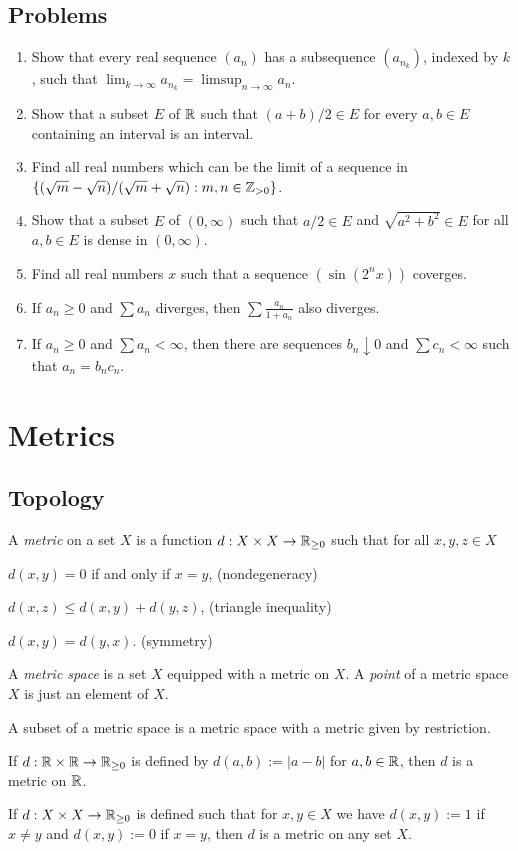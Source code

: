 \documentclass{../../large}
\begin{document}
\section*{Problems}
\begin{enumerate}
\item Show that every real sequence $(a_n)$ has a subsequence $(a_{n_k})$, indexed by $k$, such that $\lim_{k\to\infty}a_{n_k}=\limsup_{n\to\infty}a_n$.
\item Show that a subset $E$ of $\mathbb{R}$ such that $(a+b)/2\in E$ for every $a,b\in E$ containing an interval is an interval.
\item Find all real numbers which can be the limit of a sequence in $\{(\sqrt m-\sqrt n)/(\sqrt m+\sqrt n):m,n\in\mathbb{Z}_{>0}\}$.
\item Show that a subset $E$ of $(0,\infty)$ such that $a/2\in E$ and $\sqrt{a^2+b^2}\in E$ for all $a,b\in E$ is dense in $(0,\infty)$.
\item Find all real numbers $x$ such that a sequence $(\sin(2^nx))$ coverges.
\item If $a_n\ge0$ and $\sum a_n$ diverges, then $\sum\frac{a_n}{1+a_n}$ also diverges.
\item If $a_n\ge0$ and $\sum a_n<\infty$, then there are sequences $b_n\downarrow0$ and $\sum c_n<\infty$ such that $a_n=b_nc_n$.
\end{enumerate}






\chapter{Metrics}
\section{Topology}
\begin{prb}
A \emph{metric} on a set $X$ is a function $d:X\times X\to\mathbb{R}_{\ge0}$ such that for all $x,y,z\in X$
\begin{parts}[(i)]
\item $d(x,y)=0$ if and only if $x=y$, \hfill(nondegeneracy)
\item $d(x,z)\le d(x,y)+d(y,z)$, \hfill(triangle inequality)
\item $d(x,y)=d(y,x)$. \hfill(symmetry)
\end{parts}
A \emph{metric space} is a set $X$ equipped with a metric on $X$.
A \emph{point} of a metric space $X$ is just an element of $X$.
\begin{parts}
\item A subset of a metric space is a metric space with a metric given by restriction.
\item If $d:\mathbb{R}\times\mathbb{R}\to\mathbb{R}_{\ge0}$ is defined by $d(a,b):=|a-b|$ for $a,b\in\mathbb{R}$, then $d$ is a metric on $\mathbb{R}$.
\item If $d:X\times X\to\mathbb{R}_{\ge0}$ is defined such that for $x,y\in X$ we have $d(x,y):=1$ if $x\ne y$ and $d(x,y):=0$ if $x=y$, then $d$ is a metric on any set $X$.
\end{parts}
\end{prb}
\end{document}
